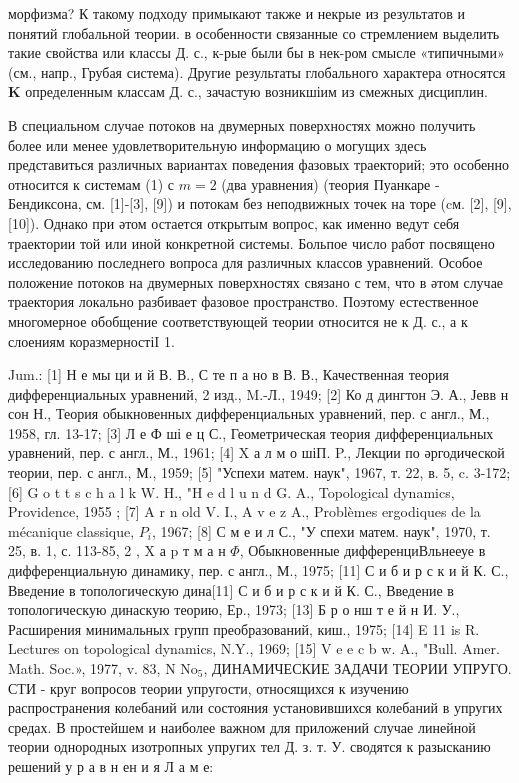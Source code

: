 \documentclass[10pt]{article}
\begin{document}
морфизма? К такому подходу примыкают также и некрые из результатов и понятий глобальной теории. в особенности связанные со стремлением выделить такие свойства или классы Д. с., к-рые были бы в нек-ром смысле «типичными» (см., напр., Грубая система). Другие результаты глобального характера относятся $\boldsymbol{K}$ определенным классам Д. с., зачастую возникшіим из смежных дисциплин.



В специальном случае потоков на двумерных поверхностях можно получить более или менее удовлетворительную информацию о могущих здесь представиться различных вариантах поведения фазовых траекторий; это особенно относится к системам (1) с $m=2$ (два уравнения) (теория Пуанкаре - Бендиксона, см. [1]-[3], [9]) и потокам без неподвижных точек на торе (cм. [2], [9], [10]). Однако при әтом остается открытым вопрос, как именно ведут себя траектории той или иной конкретной системы. Больпое число работ посвящено исследованию последнего вопроса для различных классов уравнений. Особое положение потоков на двумерных поверхностях связано с тем, что в әтом случае траектория локально разбивает фазовое пространство. Поэтому естественное многомерное обобщение соответствующей теории относится не к Д. с., а к слоениям коразмерностіI 1.



Jum.: [1] Н е мы ци и й В. В., С те п а но в В. В., Качественная теория дифференциальных уравнений, 2 изд., M.-Л., 1949; [2] Ко д дингтон Э. А., Јевв н сон Н., Теория обыкновенных дифференциальных уравнений, пер. с англ., М., 1958, гл. 13-17; [3] Л е Ф ші е ц С., Геометрическая теория дифференциальных уравнений, пер. с англ., М., 1961; [4] X а л м о шіП. P., Лекции по әргодической теории, пер. с англ., М., 1959; [5] "Успехи матем. наук", 1967, т. 22, в. 5, c. 3-172; [6] G o t t s c h a l k W. H., "H e d l u n d G. A., Topological dynamics, Providence, 1955 ; [7] A r n old V. I., A v e z A., Problèmes ergodiques de la mécanique classique, $P_{i}$, 1967; [8] С м е и л С., "У спехи матем. наук", 1970, т. 25, в. 1, с. 113-85, 2 , $\mathrm{X}$ а $\mathrm{p}$ т м а н $\Phi$, Обыкновенные дифференциВльнееуе в дифференциальную динамику, пер. с англ., М., 1975; [11] С и б и р с к и й К. С., Введение в топологическую дина[11] С и б и р с к и й К. С., Введение в топологическую динаскую теорию, Ер., 1973; [13] Б р о нш т е й н И. У., Расширения минимальных групп преобразований, киш., 1975; [14] E 11 is R. Lectures on topological dynamics, N.Y., 1969; [15] V e e c b w. A., "Bull. Amer. Math. Soc.», 1977, v. 83, N $\mathrm{No}_{5}$, ДИНАМИЧЕСКИЕ ЗАДАЧИ ТЕОРИИ УПРУГО. СТИ - круг вопросов теории упругости, относящихся к изучению распространения колебаний или состояния установившихся колебаний в упругих средах. В простейшем и наиболее важном для приложений случае линейной теории однородных изотропных упругих тел Д. з. т. У. сводятся к разысканию решений у р а в н ен и я Л а м е:
\end{document}
